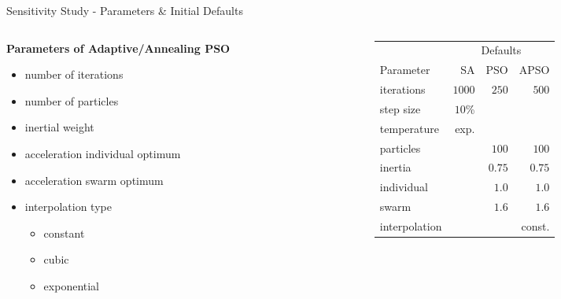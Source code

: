 \documentclass[11pt,aspectratio=169]{beamer}
\begin{document}
\begin{frame}[fragile]{Sensitivity Study - Parameters \& Initial Defaults}

    \begin{columns}
    \begin{column}{0.5\textwidth}
        \textbf{Parameters of Adaptive/Annealing PSO}
        \begin{itemize}
            \item number of iterations
            \item number of particles
            \item inertial weight
            \item acceleration individual optimum
            \item acceleration swarm optimum
            \item interpolation type
                \begin{itemize}
                    \item constant
                    \item cubic
                    \item exponential
                \end{itemize}
        \end{itemize}
    \end{column}

    \begin{column}{0.5\textwidth}
        \begin{center}
            \begin{tabular}{@{}lrrr@{}}
                \toprule
                & \multicolumn{3}{c}{Defaults}       \\
                \cmidrule(r){2-4}Parameter & SA & PSO & APSO\\
                \midrule
                iterations    & $1000$ &  $250$ &  $500$ \\
                step size     & $10$\% &        &        \\
                temperature   &   exp. &        &        \\
                particles     &        &  $100$ &  $100$ \\
                inertia       &        & $0.75$ & $0.75$ \\
                individual    &        &  $1.0$ &  $1.0$ \\
                swarm         &        &  $1.6$ &  $1.6$ \\
                interpolation &        &        & const. \\
                \bottomrule
            \end{tabular}
        \end{center}
    \end{column}
    \end{columns}

\end{frame}
\end{document}
